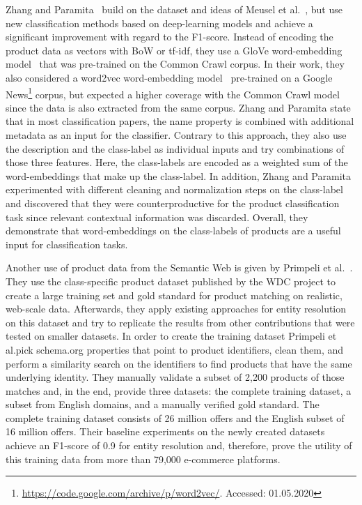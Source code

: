 Zhang and Paramita~\cite{zhang2019product} build on the dataset and ideas of Meusel et al.\@~\cite{meusel2015exploiting},
but use new classification methods based on deep-learning models and achieve a significant improvement with regard to the
F1-score.
Instead of encoding the product data as vectors with BoW or tf-idf, they use a GloVe word-embedding model~\cite{pennington2014glove}
that was pre-trained on the Common Crawl corpus.
In their work, they also considered a word2vec word-embedding model~\cite{mikolov2013distributed} pre-trained on
a Google News\footnote{\url{https://code.google.com/archive/p/word2vec/}. Accessed: 01.05.2020} corpus, but
expected a higher coverage with the Common Crawl model since the data is also extracted from the same corpus.
Zhang and Paramita state that in most classification papers, the name property is combined with additional metadata
as an input for the classifier.
Contrary to this approach, they also use the description and the class-label as individual inputs and try
combinations of those three features.
Here, the class-labels are encoded as a weighted sum of the word-embeddings that make up the class-label.
In addition, Zhang and Paramita experimented with different cleaning and normalization steps on the class-label
and discovered that they were counterproductive for the product classification task since relevant
contextual information was discarded.
Overall, they demonstrate that word-embeddings on the class-labels of products are a useful input for classification tasks.

Another use of product data from the Semantic Web is given by Primpeli et al.\@~\cite{primpeli2019wdc, petrovski2016wdc}.
They use the class-specific product dataset published by the WDC project to create a large training set and gold standard
for product matching on realistic, web-scale data.
Afterwards, they apply existing approaches for entity resolution on this dataset and try to replicate the results from
other contributions that were tested on smaller datasets.
In order to create the training dataset Primpeli et al.\@ pick schema.org properties that point to product identifiers, clean
them, and perform a similarity search on the identifiers to find products that have the same underlying identity.
They manually validate a subset of 2,200 products of those matches and, in the end, provide three datasets:
the complete training dataset, a subset from English domains, and a manually verified gold standard.
The complete training dataset consists of 26 million offers and the English subset of 16 million offers.
Their baseline experiments on the newly created datasets achieve an F1-score of 0.9 for entity resolution and, therefore,
prove the utility of this training data from more than 79,000 e-commerce platforms.

